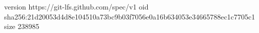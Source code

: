 version https://git-lfs.github.com/spec/v1
oid sha256:21d20053d4d8e104510a73bc9b03f7056e0a16b634053e34665788ec1c7705c1
size 238985
